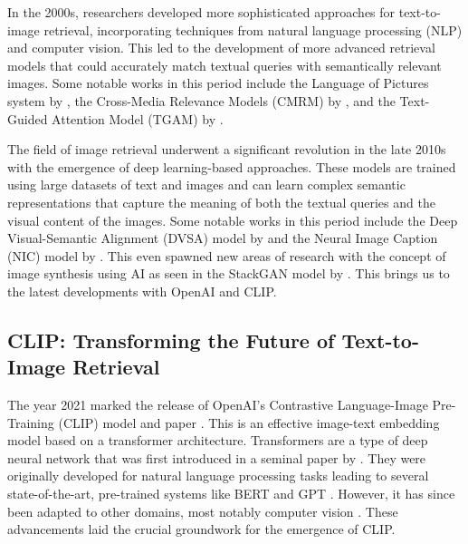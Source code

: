 \documentclass{l4proj}
\begin{document}
In the 2000s, researchers developed more sophisticated approaches for text-to-image retrieval, incorporating techniques from natural language processing (NLP) and computer vision. This led to the development of more advanced retrieval models that could accurately match textual queries with semantically relevant images. Some notable works in this period include the Language of Pictures system by \cite{lavrenko2003lop}, the Cross-Media Relevance Models (CMRM) by \cite{rasiwasia2010cmmr}, and the Text-Guided Attention Model (TGAM) by \cite{gao2018tgam}.

The field of image retrieval underwent a significant revolution in the late 2010s with the emergence of deep learning-based approaches. These models are trained using large datasets of text and images and can learn complex semantic representations that capture the meaning of both the textual queries and the visual content of the images. Some notable works in this period include the Deep Visual-Semantic Alignment (DVSA) model by \cite{karpathy2015dvsa} and the Neural Image Caption (NIC) model by \cite{vinyals2015nic}. This even spawned new areas of research with the concept of image synthesis using AI as seen in the StackGAN model by \cite{zhang2017stackgan}. This brings us to the latest developments with OpenAI and CLIP.


\subsection{CLIP: Transforming the Future of Text-to-Image Retrieval}
\label{sec:background_clip}
The year 2021 marked the release of OpenAI's Contrastive Language-Image Pre-Training (CLIP) model and paper \citep{radford2021clip}. This is an effective image-text embedding model based on a transformer architecture. Transformers are a type of deep neural network that was first introduced in a seminal paper by \cite{vaswani2017attention}. They were originally developed for natural language processing tasks leading to several state-of-the-art, pre-trained systems like BERT \citep{devlin2018bert} and GPT \citep{radford2018gpt}. However, it has since been adapted to other domains, most notably computer vision \citep{dosovitskiy2020vit}. These advancements laid the crucial groundwork for the emergence of CLIP.
\end{document}
